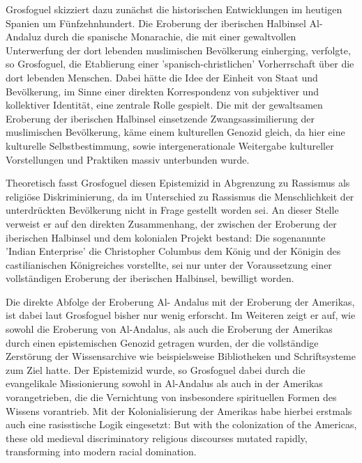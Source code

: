 Grosfoguel skizziert dazu zunächst die historischen Entwicklungen im heutigen
Spanien um Fünfzehnhundert. Die Eroberung der iberischen Halbinsel Al-Andaluz
durch die spanische Monarachie, die mit einer gewaltvollen Unterwerfung der
dort lebenden muslimischen Bevölkerung einherging, verfolgte, so Grosfoguel,
die Etablierung einer 'spanisch-christlichen' Vorherrschaft über die dort
lebenden Menschen. Dabei hätte die Idee der Einheit von Staat und Bevölkerung,
im Sinne einer direkten Korrespondenz von subjektiver und kollektiver
Identität, eine zentrale Rolle gespielt. \footnotemark
{} Die mit
der gewaltsamen Eroberung der iberischen Halbinsel einsetzende
Zwangsassimilierung der muslimischen Bevölkerung, käme einem kulturellen
Genozid gleich, da hier eine kulturelle Selbstbestimmung, sowie
intergenerationale Weitergabe kultureller Vorstellungen und Praktiken massiv
unterbunden wurde. \footnotemark {}

Theoretisch fasst Grosfoguel diesen Epistemizid in Abgrenzung zu Rassismus als
religiöse Diskriminierung, da im Unterschied zu Rassismus die Menschlichkeit
der unterdrückten Bevölkerung nicht in Frage gestellt worden sei.\footnotemark
{} An dieser Stelle verweist er auf den direkten Zusammenhang, der zwischen der Eroberung
der iberischen Halbinsel und dem kolonialen Projekt bestand: Die sogenannnte
'Indian Enterprise' die Christopher Columbus dem König und der Königin des
castilianischen Königreiches vorstellte, sei nur unter der Voraussetzung einer
vollständigen Eroberung der iberischen Halbinsel, bewilligt worden.

Die direkte Abfolge der Eroberung Al- Andalus mit der Eroberung der Amerikas,
ist dabei laut Grosfoguel bisher nur wenig erforscht.\footnotemark
{} Im Weiteren zeigt er
auf, wie sowohl die Eroberung von Al-Andalus, als auch die Eroberung der
Amerikas durch einen epistemischen Genozid getragen wurden, der die
vollständige Zerstörung der Wissensarchive wie beispielsweise Bibliotheken und
Schriftsysteme zum Ziel hatte.\footnotemark
{}  Der Epistemizid wurde, so Grosfoguel dabei
durch die evangelikale Missionierung sowohl in Al-Andalus als auch in der
Amerikas vorangetrieben, die die Vernichtung von insbesondere spirituellen
Formen des Wissens vorantrieb. Mit der Kolonialisierung der Amerikas habe
hierbei erstmals auch eine rasisstische Logik eingesetzt: \glqq But with the
colonization of the Americas, these old medieval discriminatory religious
discourses mutated rapidly, transforming into modern racial domination. \grqq
\footnotemark {}


